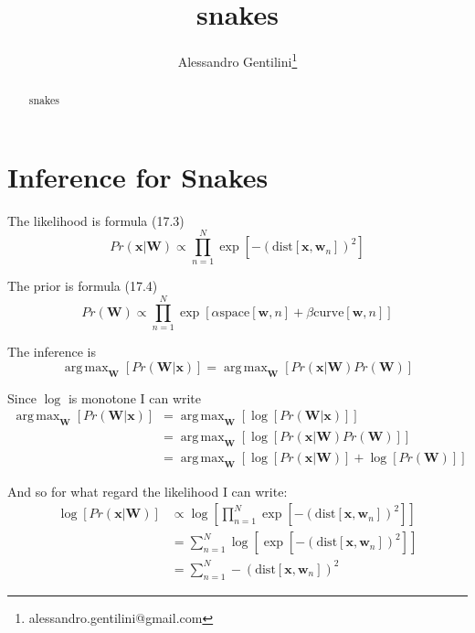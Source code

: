 \documentclass[a4paper,12pt]{article}
\title{snakes}
\author{Alessandro Gentilini\thanks{alessandro.gentilini@gmail.com}}
\DeclareMathOperator*{\argmax}{arg\,max}
\begin{document}
\maketitle

\begin{abstract}
snakes
\end{abstract} 

\section{Inference for Snakes}
The likelihood is formula (17.3)
\begin{equation}
Pr(\mathbf{x}\vert\mathbf{W})\propto \prod_{n=1}^N \exp{[-(\text{dist}[\mathbf{x},\mathbf{w}_n])^2]}
\end{equation}

The prior is formula (17.4)
\begin{equation}
Pr(\mathbf{W})\propto \prod_{n=1}^N \exp{[\alpha \text{space}[\mathbf{w},n]+\beta \text{curve}[\mathbf{w},n]]}
\end{equation}

The inference is 
\begin{equation}
\argmax_{\mathbf{W}}[Pr(\mathbf{W}\vert\mathbf{x})] = 
\argmax_{\mathbf{W}}[Pr(\mathbf{x}\vert\mathbf{W})Pr(\mathbf{W})]
\end{equation}

Since $\log$ is monotone I can write
\begin{equation}
\begin{split}
\argmax_{\mathbf{W}}[Pr(\mathbf{W}\vert\mathbf{x})] & = 
\argmax_{\mathbf{W}}[\log{[Pr(\mathbf{W}\vert\mathbf{x})]}] \\
& = \argmax_{\mathbf{W}}[\log{[Pr(\mathbf{x}\vert\mathbf{W})Pr(\mathbf{W})]}] \\
& = \argmax_{\mathbf{W}}[\log{[Pr(\mathbf{x}\vert\mathbf{W})]}+\log{[Pr(\mathbf{W})]}]
\end{split}
\end{equation}

And so for what regard the likelihood I can write:
\begin{equation}
\begin{split}
\log{[Pr(\mathbf{x}\vert\mathbf{W})]} & \propto \log{[\prod_{n=1}^N \exp{[-(\text{dist}[\mathbf{x},\mathbf{w}_n])^2]}]} \\
& =\sum_{n=1}^N \log{[\exp{[-(\text{dist}[\mathbf{x},\mathbf{w}_n])^2]}]} \\
& =\sum_{n=1}^N -(\text{dist}[\mathbf{x},\mathbf{w}_n])^2
\end{split}
\end{equation}
\end{document}
